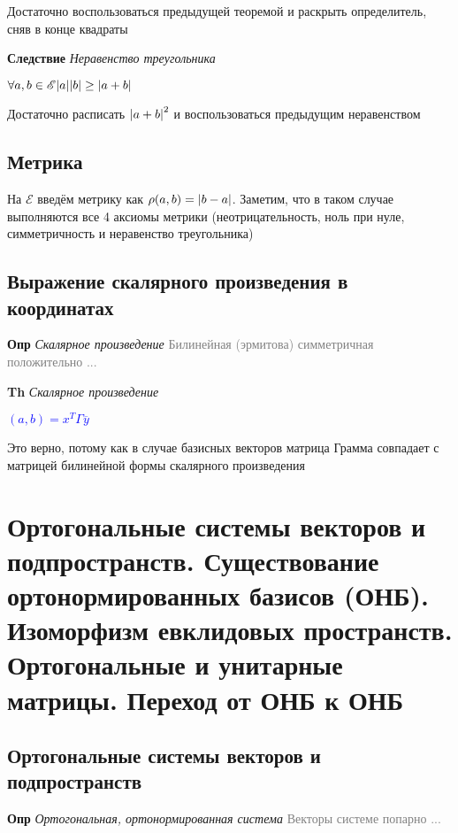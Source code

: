 \documentclass[a4paper, 14pt]{article}
\begin{document}
    Достаточно воспользоваться предыдущей теоремой и раскрыть определитель, сняв в конце квадраты
    
    \textbf{Следствие} \textit{Неравенство треугольника}
    
    \textcolor{blue}{$\forall a, b \in \mathscr{E} \abs{a} \abs{b} \geq \abs{a + b}$}
    
    Достаточно расписать $\abs{a+b}^2$ и воспользоваться предыдущим неравенством
    
    \subsection{Метрика}
    
    На $\mathscr{E}$ введём метрику как $\rho (a, b) = \abs{b - a}$.
    Заметим, что в таком случае выполняются все 4 аксиомы метрики (неотрицательность, ноль при нуле, симметричность и
    неравенство треугольника)
    
    \subsection{Выражение скалярного произведения в координатах}
    
    \textbf{Опр} \textit{Скалярное произведение} \textcolor{gray}{Билинейная (эрмитова) симметричная положительно ...}
    
    \textbf{Th} \textit{Скалярное произведение}
    
    \textcolor{blue}{$(a, b) = x^T \Gamma \overline{y}$}
    
    Это верно, потому как в случае базисных векторов матрица Грамма совпадает с матрицей билинейной формы скалярного
    произведения
    
    \section{Ортогональные системы векторов и подпространств.
    Существование ортонормированных базисов (ОНБ).
    Изоморфизм евклидовых пространств.
    Ортогональные и унитарные матрицы.
    Переход от ОНБ к ОНБ}
    
    \subsection{Ортогональные системы векторов и подпространств}
    
    \textbf{Опр} \textit{Ортогональная, ортонормированная система} \textcolor{gray}{Векторы системе попарно ...}
    
\end{document}
